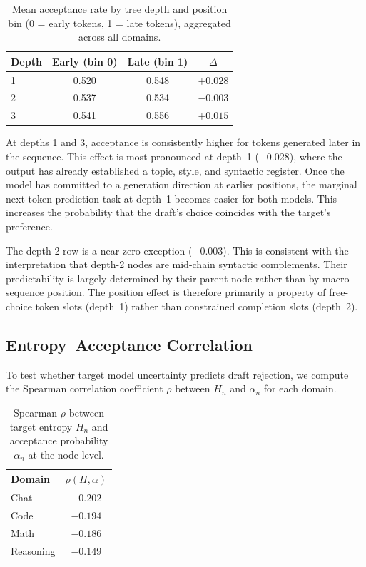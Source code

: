\documentclass[conference]{IEEEtran}
\begin{document}
\begin{table}[h]
\centering
\caption{Mean acceptance rate by tree depth and position bin (0 = early
tokens, 1 = late tokens), aggregated across all domains.}
\label{tab:pos}
\begin{tabular}{lccc}
\toprule
Depth & Early (bin 0) & Late (bin 1) & $\Delta$ \\
\midrule
1 & 0.520 & 0.548 & $+0.028$ \\
2 & 0.537 & 0.534 & $-0.003$ \\
3 & 0.541 & 0.556 & $+0.015$ \\
\bottomrule
\end{tabular}
\end{table}

At depths 1 and 3, acceptance is consistently higher for tokens generated
later in the sequence. This effect is most pronounced at depth~1 (+0.028),
where the output has already established a topic, style, and syntactic register.
Once the model has committed to a generation direction at earlier positions,
the marginal next-token prediction task at depth~1 becomes easier for both models.
This increases the probability that the draft's choice coincides with the
target's preference.

The depth-2 row is a near-zero exception ($-0.003$). This is consistent with
the interpretation that depth-2 nodes are mid-chain syntactic complements.
Their predictability is largely determined by their parent node rather
than by macro sequence position. The position effect is therefore primarily
a property of free-choice token slots (depth~1) rather than constrained
completion slots (depth~2).

\subsection{Entropy--Acceptance Correlation}

To test whether target model uncertainty predicts draft rejection, we compute
the Spearman correlation coefficient $\rho$ between $H_n$ and $\alpha_n$ for
each domain.

\begin{table}[h]
\centering
\caption{Spearman $\rho$ between target entropy $H_n$ and acceptance
probability $\alpha_n$ at the node level.}
\label{tab:rho}
\begin{tabular}{lc}
\toprule
Domain & $\rho(H, \alpha)$ \\
\midrule
Chat      & $-0.202$ \\
Code      & $-0.194$ \\
Math      & $-0.186$ \\
Reasoning & $-0.149$ \\
\bottomrule
\end{tabular}
\end{table}
\end{document}
